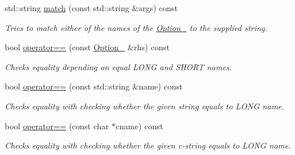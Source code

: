 \begin{DoxyCompactItemize}
    \item
    std\+::string \mbox{\hyperlink{class_info_parse_1_1_option___3_01bool_01_4_a45655f1d4d59a0e76e208794c1c1e44e}{match}} (const std\+::string \&args) const
    \begin{DoxyCompactList}
        \small\item\em Tries to match either of the names of the \mbox{\hyperlink{class_info_parse_1_1_option__}{Option\+\_\+}} to the supplied string.
    \end{DoxyCompactList}\item
    bool \mbox{\hyperlink{class_info_parse_1_1_option___3_01bool_01_4_ad590c478c64f49ebf6d697866b00f488}{operator==}} (const \mbox{\hyperlink{class_info_parse_1_1_option__}{Option\+\_\+}} \&rhs) const
    \begin{DoxyCompactList}
        \small\item\em Checks equality depending on equal L\+O\+NG and S\+H\+O\+RT names.
    \end{DoxyCompactList}\item
    \mbox{\label{class_info_parse_1_1_option___3_01bool_01_4_a814163670e6689798ff15f52a94437bb}}
    bool \mbox{\hyperlink{class_info_parse_1_1_option___3_01bool_01_4_a814163670e6689798ff15f52a94437bb}{operator==}} (const std\+::string \&name) const
    \begin{DoxyCompactList}
        \small\item\em Checks equality with checking whether the given string equals to L\+O\+NG name.
    \end{DoxyCompactList}\item
    \mbox{\label{class_info_parse_1_1_option___3_01bool_01_4_ada54a0b6c9a800a40bd6e0dcdbabc5fe}}
    bool \mbox{\hyperlink{class_info_parse_1_1_option___3_01bool_01_4_ada54a0b6c9a800a40bd6e0dcdbabc5fe}{operator==}} (const char $\ast$cname) const
    \begin{DoxyCompactList}
        \small\item\em Checks equality with checking whether the given c-\/string equals to L\+O\+NG name.
    \end{DoxyCompactList}\item
    \mbox{\label{class_info_parse_1_1_option___3_01bool_01_4_aca9395fc19886c2cb010c352d3d66fca}}

\end{DoxyCompactItemize}
